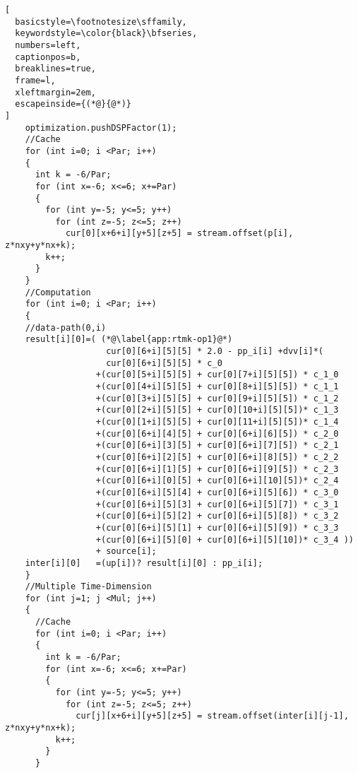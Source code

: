 \begin{lstlisting}[
  basicstyle=\footnotesize\sffamily,
  keywordstyle=\color{black}\bfseries,
  numbers=left,
  captionpos=b,
  breaklines=true,
  frame=l,
  xleftmargin=2em,
  escapeinside={(*@}{@*)}
]
    optimization.pushDSPFactor(1);
    //Cache
    for (int i=0; i <Par; i++)
    {
      int k = -6/Par;
      for (int x=-6; x<=6; x+=Par)
      {
        for (int y=-5; y<=5; y++)
          for (int z=-5; z<=5; z++)
            cur[0][x+6+i][y+5][z+5] = stream.offset(p[i], z*nxy+y*nx+k);
        k++;
      }
    }
    //Computation
    for (int i=0; i <Par; i++)
    {
    //data-path(0,i)
    result[i][0]=( (*@\label{app:rtmk-op1}@*)
                    cur[0][6+i][5][5] * 2.0 - pp_i[i] +dvv[i]*(
                    cur[0][6+i][5][5] * c_0
                  +(cur[0][5+i][5][5] + cur[0][7+i][5][5]) * c_1_0
                  +(cur[0][4+i][5][5] + cur[0][8+i][5][5]) * c_1_1
                  +(cur[0][3+i][5][5] + cur[0][9+i][5][5]) * c_1_2
                  +(cur[0][2+i][5][5] + cur[0][10+i][5][5])* c_1_3
                  +(cur[0][1+i][5][5] + cur[0][11+i][5][5])* c_1_4
                  +(cur[0][6+i][4][5] + cur[0][6+i][6][5]) * c_2_0
                  +(cur[0][6+i][3][5] + cur[0][6+i][7][5]) * c_2_1
                  +(cur[0][6+i][2][5] + cur[0][6+i][8][5]) * c_2_2
                  +(cur[0][6+i][1][5] + cur[0][6+i][9][5]) * c_2_3
                  +(cur[0][6+i][0][5] + cur[0][6+i][10][5])* c_2_4
                  +(cur[0][6+i][5][4] + cur[0][6+i][5][6]) * c_3_0
                  +(cur[0][6+i][5][3] + cur[0][6+i][5][7]) * c_3_1
                  +(cur[0][6+i][5][2] + cur[0][6+i][5][8]) * c_3_2
                  +(cur[0][6+i][5][1] + cur[0][6+i][5][9]) * c_3_3
                  +(cur[0][6+i][5][0] + cur[0][6+i][5][10])* c_3_4 ))
                  + source[i];
    inter[i][0]   =(up[i])? result[i][0] : pp_i[i];
    }
    //Multiple Time-Dimension
    for (int j=1; j <Mul; j++)
    {
      //Cache
      for (int i=0; i <Par; i++)
      {
        int k = -6/Par;
        for (int x=-6; x<=6; x+=Par)
        {
          for (int y=-5; y<=5; y++)
            for (int z=-5; z<=5; z++)
              cur[j][x+6+i][y+5][z+5] = stream.offset(inter[i][j-1], z*nxy+y*nx+k);
          k++;
        }
      }


\end{lstlisting}
